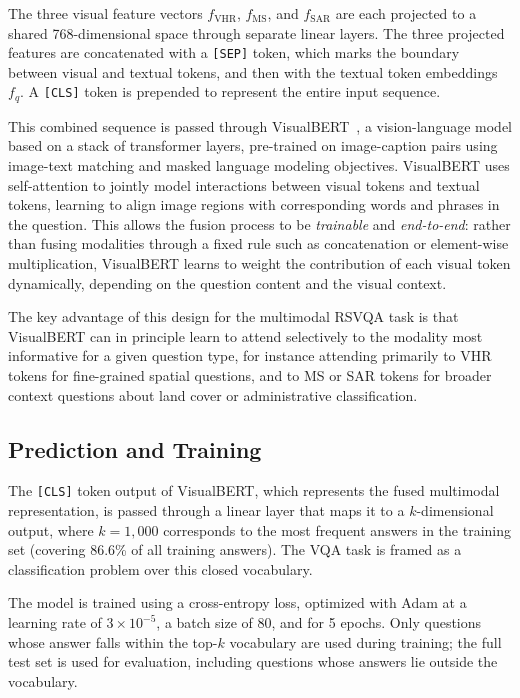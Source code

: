 The three visual feature vectors $f_\text{VHR}$,
$f_\text{MS}$, and $f_\text{SAR}$ are each projected to a
shared 768-dimensional space through separate linear layers.
The three projected features are concatenated with a
\texttt{[SEP]} token, which marks the boundary between
visual and textual tokens, and then with the textual token
embeddings $f_q$. A \texttt{[CLS]} token is prepended to
represent the entire input sequence.

This combined sequence is passed through
VisualBERT~\cite{li2019visualbert}, a vision-language
model based on a stack of transformer layers, pre-trained
on image-caption pairs using image-text matching and masked
language modeling objectives. VisualBERT uses self-attention
to jointly model interactions between visual tokens and
textual tokens, learning to align image regions with
corresponding words and phrases in the question. This
allows the fusion process to be \textit{trainable} and
\textit{end-to-end}: rather than fusing modalities through
a fixed rule such as concatenation or element-wise
multiplication, VisualBERT learns to weight the
contribution of each visual token dynamically, depending on
the question content and the visual context.

The key advantage of this design for the multimodal RSVQA
task is that VisualBERT can in principle learn to attend
selectively to the modality most informative for a given
question type, for instance attending primarily to VHR
tokens for fine-grained spatial questions, and to MS or SAR
tokens for broader context questions about land cover or
administrative classification.

\subsection{Prediction and Training}
\label{sec:chap5_method_prediction}

The \texttt{[CLS]} token output of VisualBERT, which
represents the fused multimodal representation, is passed
through a linear layer that maps it to a $k$-dimensional
output, where $k = 1{,}000$ corresponds to the most
frequent answers in the training set (covering 86.6\% of
all training answers). The VQA task is framed as a
classification problem over this closed vocabulary.

The model is trained using a cross-entropy loss, optimized
with Adam at a learning rate of $3 \times 10^{-5}$, a
batch size of 80, and for 5 epochs. Only questions whose
answer falls within the top-$k$ vocabulary are used during
training; the full test set is used for evaluation,
including questions whose answers lie outside the vocabulary.

